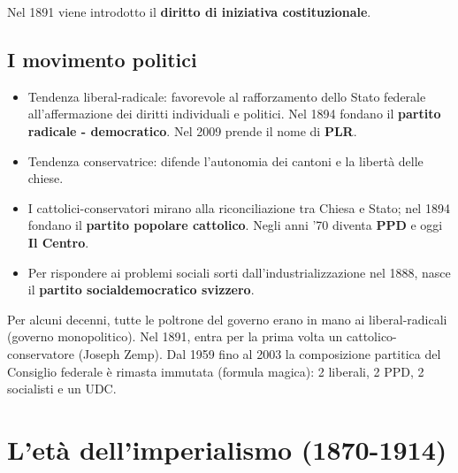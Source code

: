 \documentclass[a4paper]{article}
\begin{document}
Nel 1891 viene introdotto il \textbf{diritto di iniziativa costituzionale}.

\subsection{I movimento politici}

\begin{itemize}
    \item Tendenza liberal-radicale: favorevole al rafforzamento dello Stato federale all'affermazione dei diritti individuali e politici.
    Nel 1894 fondano il \textbf{partito radicale - democratico}.
    Nel 2009 prende il nome di \textbf{PLR}.
    \item Tendenza conservatrice: difende l'autonomia dei cantoni e la libertà delle chiese.
    \item I cattolici-conservatori mirano alla riconciliazione tra Chiesa e Stato; nel 1894 fondano il \textbf{partito popolare cattolico}.
    Negli anni '70 diventa \textbf{PPD} e oggi \textbf{Il Centro}.
    \item Per rispondere ai problemi sociali sorti dall'industrializzazione nel 1888, nasce il \textbf{partito socialdemocratico svizzero}.
\end{itemize}

Per alcuni decenni, tutte le poltrone del governo erano in mano ai liberal-radicali (governo monopolitico).
Nel 1891, entra per la prima volta un cattolico-conservatore (Joseph Zemp).
Dal 1959 fino al 2003 la composizione partitica del Consiglio federale è rimasta immutata (formula magica):
2 liberali, 2 PPD, 2 socialisti e un UDC.

\pagebreak

\section{L'età dell'imperialismo (1870-1914)} %


\end{document}
